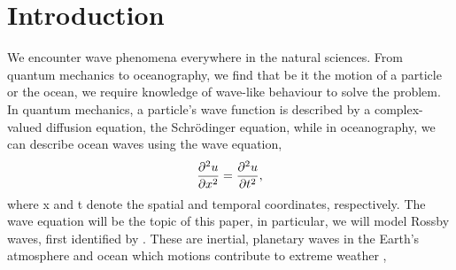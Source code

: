 \section{Introduction}
\label{sec:introduction}

We encounter wave phenomena everywhere in the natural sciences. From quantum mechanics to oceanography, we find that be it the motion of a particle or the ocean, we require knowledge of wave-like behaviour to solve the problem. In quantum mechanics, a particle's wave function is described by a complex-valued diffusion equation, the Schrödinger equation, while in oceanography, we can describe ocean waves using the wave equation,
	\begin{equation}
	\label{eq:wave}
	\pdv[2]{u}{x} = \pdv[2]{u}{t},
	\end{equation}
where x and t denote the spatial and temporal coordinates, respectively. The wave equation will be the topic of this paper, in particular, we will model Rossby waves, first identified by \citet{rossby}. These are inertial, planetary waves in the Earth's atmosphere and ocean which motions contribute to extreme weather \citet{mann2017influence}, 